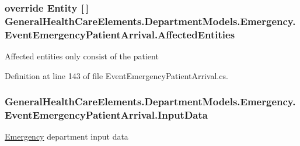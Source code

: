 \subsubsection[{\texorpdfstring{Affected\+Entities}{AffectedEntities}}]{\setlength{\rightskip}{0pt plus 5cm}override {\bf Entity} \mbox{[}$\,$\mbox{]} General\+Health\+Care\+Elements.\+Department\+Models.\+Emergency.\+Event\+Emergency\+Patient\+Arrival.\+Affected\+Entities\hspace{0.3cm}{\ttfamily [get]}}\hypertarget{class_general_health_care_elements_1_1_department_models_1_1_emergency_1_1_event_emergency_patient_arrival_a6eba2e2ae9c982db6928786c023c7595}{}\label{class_general_health_care_elements_1_1_department_models_1_1_emergency_1_1_event_emergency_patient_arrival_a6eba2e2ae9c982db6928786c023c7595}


Affected entities only consist of the patient 



Definition at line 143 of file Event\+Emergency\+Patient\+Arrival.\+cs.

\subsubsection[{\texorpdfstring{Input\+Data}{InputData}}]{ General\+Health\+Care\+Elements.\+Department\+Models.\+Emergency.\+Event\+Emergency\+Patient\+Arrival.\+Input\+Data\hspace{0.3cm}{\ttfamily [get]}}\hypertarget{class_general_health_care_elements_1_1_department_models_1_1_emergency_1_1_event_emergency_patient_arrival_adfeb92a2f5ab336c14e2409bb10eec41}{}\label{class_general_health_care_elements_1_1_department_models_1_1_emergency_1_1_event_emergency_patient_arrival_adfeb92a2f5ab336c14e2409bb10eec41}


\hyperlink{namespace_general_health_care_elements_1_1_department_models_1_1_emergency}{Emergency} department input data 



